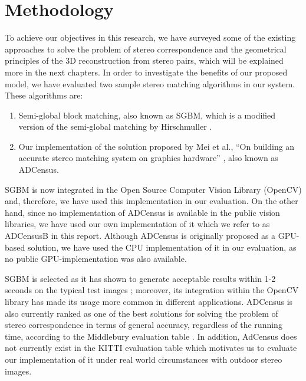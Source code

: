 
\section{Methodology}
To achieve our objectives in this research, we have surveyed some of the existing approaches to solve the problem 
of stereo correspondence and the geometrical principles of the 3D reconstruction from stereo pairs, which will be explained more 
in the next chapters. 
In order to investigate the benefits of our proposed model, we have evaluated two sample stereo matching algorithms in our system. 
These algorithms are:
\begin{enumerate}
\item Semi-global block matching, also known as SGBM, which is a modified version of the semi-global matching by Hirschmuller \cite{hir08}.
\item Our implementation of the solution proposed by Mei et al., ``On building an accurate stereo matching system on graphics hardware'' \cite{mei11}, also known as ADCensus.
\end{enumerate}

SGBM is now integrated in the Open Source Computer Vision Library (OpenCV) \cite{sgbm} and, therefore, we have used this implementation
in our evaluation.
On the other hand, since no implementation of ADCensus is available in the public vision libraries, we have used our own implementation of it 
which we refer to as ADCensusB in this report.
Although ADCensus is originally proposed as a GPU-based solution, we have used the CPU implementation of it in our evaluation, as no public GPU-implementation was also available.

SGBM is selected as it has shown to generate acceptable results within 1-2 seconds on the typical test images \cite{hir08}; moreover,
its integration within the OpenCV library has made its usage more common in different applications. 
ADCensus is also currently ranked as one of the best solutions 
for solving the problem of stereo correspondence in terms of general accuracy, regardless of the running time, 
according to the Middlebury evaluation table \cite{mideval}.
In addition, AdCensus does not currently exist in the KITTI evaluation table which motivates us to evaluate our implementation of it
under real world circumstances with outdoor stereo images.

